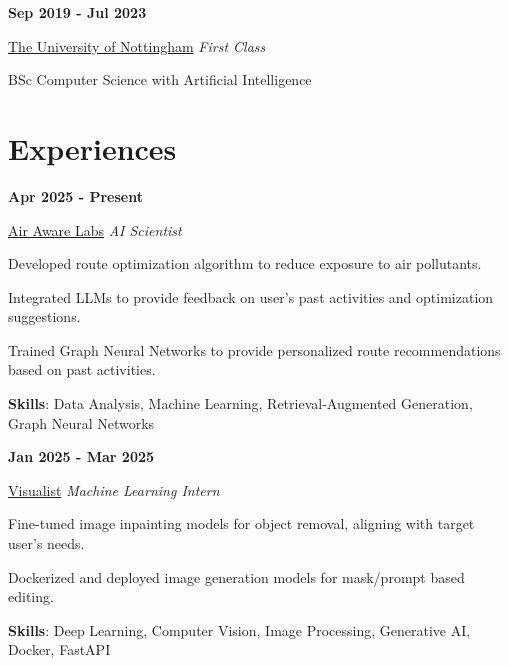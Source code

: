 \documentclass[9pt,a4paper]{article} %
\newenvironment{itemize-noindent}
{
\setlength{\leftmargini}{1em}
\begin{itemize}
\setlength{\itemsep}{0pt}
\setlength{\parskip}{0pt}
}
{\end{itemize}}
\begin{document}
\begin{multicols}{2}

\textbf{Sep 2019 - Jul 2023}

\href{https://www.nottingham.ac.uk}{The University of Nottingham} \hfill \textit{First Class}

BSc Computer Science with Artificial Intelligence


\section{Experiences}

\textbf{Apr 2025 - Present}

\href{https://www.airawarelabs.com}{Air Aware Labs} \hfill \textit{AI Scientist}

\begin{itemize-noindent}
    \item Developed route optimization algorithm to reduce exposure to air pollutants.
    \item Integrated LLMs to provide feedback on user's past activities and optimization suggestions.
    \item Trained Graph Neural Networks to provide personalized route recommendations based on past activities.
    \item \textbf{Skills}: Data Analysis, Machine Learning, Retrieval-Augmented Generation, Graph Neural Networks
\end{itemize-noindent}
\vspace{2mm}


\textbf{Jan 2025 - Mar 2025}

\href{https://visualistapp.com/}{Visualist} \hfill \textit{Machine Learning Intern}

\begin{itemize-noindent}
    \item Fine-tuned image inpainting models for object removal, aligning with target user's needs.
    \item Dockerized and deployed image generation models for mask/prompt based editing.
    \item \textbf{Skills}: Deep Learning, Computer Vision, Image Processing, Generative AI, Docker, FastAPI
\end{itemize-noindent}
\vspace{2mm}


\end{multicols}
\end{document}
